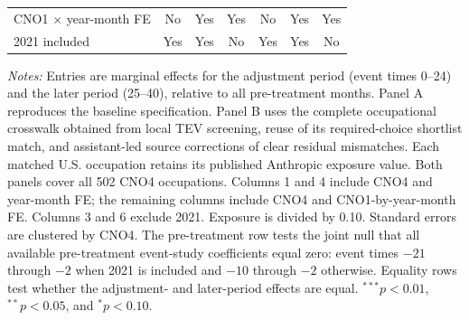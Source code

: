 \begin{table}[H]
\begin{threeparttable}
{\begin{tabular}{lcccccc}
\midrule
CNO1 $\times$ year-month FE & No & Yes & Yes & No & Yes & Yes \\
2021 included & Yes & Yes & No & Yes & Yes & No \\
\bottomrule
\end{tabular}
}
\begin{minipage}{0.92\textwidth}
\footnotesize
\emph{Notes:} Entries are marginal effects for the adjustment period (event times 0--24) and the later period (25--40), relative to all pre-treatment months. Panel A reproduces the baseline specification. Panel B uses the complete occupational crosswalk obtained from local TEV screening, reuse of its required-choice shortlist match, and assistant-led source corrections of clear residual mismatches. Each matched U.S. occupation retains its published Anthropic exposure value. Both panels cover all 502 CNO4 occupations. Columns 1 and 4 include CNO4 and year-month FE; the remaining columns include CNO4 and CNO1-by-year-month FE. Columns 3 and 6 exclude 2021. Exposure is divided by 0.10. Standard errors are clustered by CNO4. The pre-treatment row tests the joint null that all available pre-treatment event-study coefficients equal zero: event times $-21$ through $-2$ when 2021 is included and $-10$ through $-2$ otherwise. Equality rows test whether the adjustment- and later-period effects are equal. $^{***}p<0.01$, $^{**}p<0.05$, and $^{*}p<0.10$.
\end{minipage}
\end{threeparttable}
\end{table}
